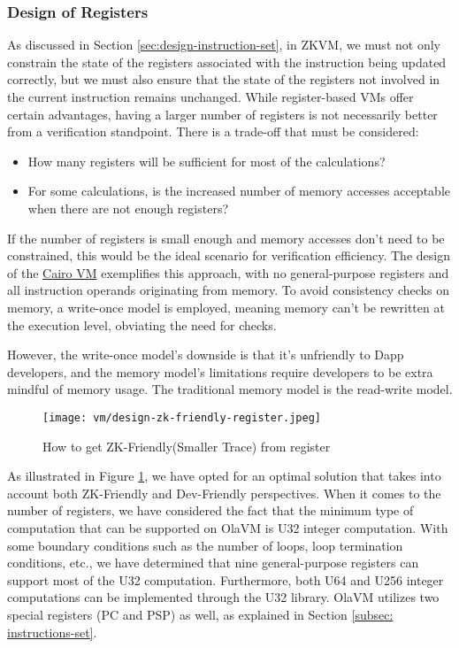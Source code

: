 \subsubsection{Design of Registers} \label{sec:design-registers}

As discussed in Section \ref{sec:design-instruction-set}, in ZKVM, we must not only constrain the state of the registers associated with the instruction being updated correctly, 
but we must also ensure that the state of the registers not involved in the current instruction remains unchanged. 
While register-based VMs offer certain advantages, having a larger number of registers is not necessarily better from a verification standpoint. 
There is a trade-off that must be considered:
\begin{itemize}
    \item How many registers will be sufficient for most of the calculations?
    \item For some calculations, is the increased number of memory accesses acceptable when there are not enough registers?
\end{itemize}

If the number of registers is small enough and memory accesses don't need to be constrained, this would be the ideal scenario for verification efficiency. 
The design of the \href{https://starkware.co/cairo/}{Cairo VM} exemplifies this approach, with no general-purpose registers and all instruction operands originating from memory. 
To avoid consistency checks on memory, a write-once model is employed, meaning memory can't be rewritten at the execution level, obviating the need for checks.

However, the write-once model's downside is that it's unfriendly to Dapp developers, and the memory model's limitations require developers to be extra mindful of memory usage. 
The traditional memory model is the read-write model.

\begin{figure}[!ht]
    \centering
    \texttt{[image: vm/design-zk-friendly-register.jpeg]}
    \caption{How to get ZK-Friendly(Smaller Trace) from register}
    \label{fig:design-zk-friendly-register}
\end{figure}

As illustrated in Figure \ref{fig:design-zk-friendly-register}, we have opted for an optimal solution that takes into account both ZK-Friendly and Dev-Friendly perspectives. 
When it comes to the number of registers, we have considered the fact that the minimum type of computation that can be supported on OlaVM is U32 integer computation. 
With some boundary conditions such as the number of loops, loop termination conditions, etc., we have determined that nine general-purpose registers can support most of the U32 computation. 
Furthermore, both U64 and U256 integer computations can be implemented through the U32 library. 
OlaVM utilizes two special registers (PC and PSP) as well, as explained in Section \ref{subsec: instructions-set}.

